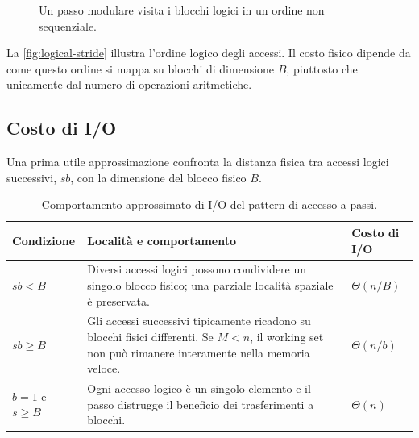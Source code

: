 \begin{figure}[H]
  \centering
  \caption{Un passo modulare visita i blocchi logici in un ordine non sequenziale.}
  \label{fig:logical-stride}
\end{figure}

La \autoref{fig:logical-stride} illustra l'ordine logico degli accessi. Il costo fisico dipende da come questo ordine si mappa su blocchi di dimensione $B$, piuttosto che unicamente dal numero di operazioni aritmetiche.

\subsection{Costo di I/O}
\label{subsec:stride-io}

Una prima utile approssimazione confronta la distanza fisica tra accessi logici successivi, $s b$, con la dimensione del blocco fisico $B$.

\begin{table}[H]
  \centering
  \caption{Comportamento approssimato di I/O del pattern di accesso a passi.}
  \label{tab:stride-io}
  \begin{tabularx}{\textwidth}{@{}p{}YY@{}}
    \toprule
    Condizione & Località e comportamento & Costo di I/O \\
    \midrule
    $s b < B$ & Diversi accessi logici possono condividere un singolo blocco fisico; una parziale località spaziale è preservata. & $\Theta(n/B)$ \\
    $s b \geq B$ & Gli accessi successivi tipicamente ricadono su blocchi fisici differenti. Se $M<n$, il working set non può rimanere interamente nella memoria veloce. &
      $\Theta(n/b)$ \\
    $b=1$ e $s\geq B$ & Ogni accesso logico è un singolo elemento e il passo distrugge il beneficio dei trasferimenti a blocchi. & $\Theta(n)$ \\
    \bottomrule
  \end{tabularx}
\end{table}

